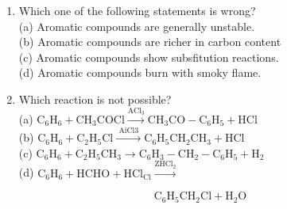 \documentclass[10pt]{article}
\begin{document}
\begin{enumerate}
(d) $\left(\mathrm{C}_{6} \mathrm{H}_{6}\right)_{2} \mathrm{Al}^{+} \mathrm{CrCl}_{4}^{-}$
  \item Which one of the following statements is wrong?\\
(a) Aromatic compounds are generally unstable.\\
(b) Aromatic compounds are richer in carbon content\\
(c) Aromatic compounds show subsfitution reactions.\\
(d) Aromatic compounds burn with smoky flame.
  \item Which reaction is not possible?\\
(a) $\mathrm{C}_{6} \mathrm{H}_{6}+\mathrm{CH}_{3} \mathrm{COCl} \xrightarrow{\mathrm{ACl}_{3}} \mathrm{CH}_{3} \mathrm{CO}-\mathrm{C}_{6} \mathrm{H}_{5}+\mathrm{HCl}$\\
(b) $\mathrm{C}_{6} \mathrm{H}_{6}+\mathrm{C}_{2} \mathrm{H}_{5} \mathrm{Cl} \xrightarrow{\text { AiCl3 }} \mathrm{C}_{6} \mathrm{H}_{5} \mathrm{CH}_{2} \mathrm{CH}_{3}+\mathrm{HCl}$\\
(c) $\mathrm{C}_{6} \mathrm{H}_{6}+\mathrm{C}_{2} \mathrm{H}_{5} \mathrm{CH}_{3} \rightarrow \mathrm{C}_{6} \mathrm{H}_{3}-\mathrm{CH}_{2}-\mathrm{C}_{6} \mathrm{H}_{5}+\mathrm{H}_{2}$\\
(d) $\mathrm{C}_{6} \mathrm{H}_{6}+\mathrm{HCHO}+\mathrm{HCl}_{\mathrm{Cl}} \xrightarrow{\mathrm{ZHCl}_{2}}$
\end{enumerate}

$$
\mathrm{C}_{6} \mathrm{H}_{5} \mathrm{CH}_{2} \mathrm{Cl}+\mathrm{H}_{2} \mathrm{O}
$$
\end{document}
